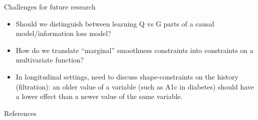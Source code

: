 \documentclass[smaller]{beamer}\usepackage{listings}
\begin{document}
\begin{frame}[label={sec:org0c087bd}]{Challenges for future research}
\begin{itemize}
\item Should we distinguish between learning Q vs G parts of a causal
model/information loss model?

\item How do we translate ``marginal'' smoothness constraints into 
constraints on a multivariate function?

\item In longitudinal settings, need to discuss shape-constraints on the
history (filtration): an older value of a variable (such as A1c in
diabetes) should have a lower effect than a newer value of the same
variable.
\end{itemize}
\end{frame}

\begin{frame}[label={sec:org239f481}]{References}
\footnotesize 
\end{frame}
\end{document}

